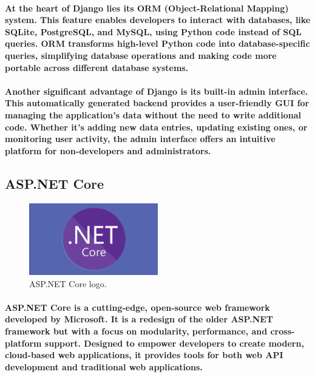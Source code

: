 \documentclass[12pt,a4paper]{article}
\begin{document}
    \paragraph{At the heart of Django lies its ORM (Object-Relational Mapping) system. This feature enables developers to interact with databases, like SQLite, PostgreSQL, and MySQL, using Python code instead of SQL queries. ORM transforms high-level Python code into database-specific queries, simplifying database operations and making code more portable across different database systems.}
    
    \paragraph{Another significant advantage of Django is its built-in admin interface. This automatically generated backend provides a user-friendly GUI for managing the application’s data without the need to write additional code. Whether it’s adding new data entries, updating existing ones, or monitoring user activity, the admin interface offers an intuitive platform for non-developers and administrators.}

    \subsection{ASP.NET Core}

    \begin{figure}[h!]
      \centering
      \includegraphics[width=0.5\textwidth]{asp.png}
      \caption{ASP.NET Core logo.}
    \end{figure}

    \paragraph{ASP.NET Core is a cutting-edge, open-source web framework developed by Microsoft. It is a redesign of the older ASP.NET framework but with a focus on modularity, performance, and cross-platform support. Designed to empower developers to create modern, cloud-based web applications, it provides tools for both web API development and traditional web applications.}
    
\end{document}
